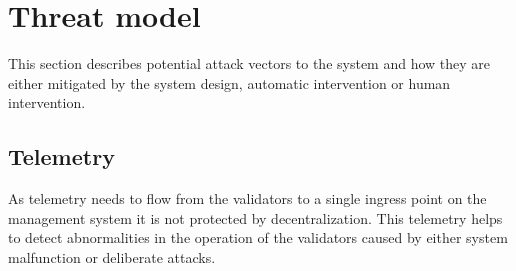 \section{Threat model}

This section describes potential attack vectors to the system and how they are either mitigated by the system design, automatic intervention or human intervention.

\subsection{Telemetry}

As telemetry needs to flow from the validators to a single ingress point on the management system it is not protected by decentralization.
This telemetry helps to detect abnormalities in the operation of the validators caused by either system malfunction or deliberate attacks.

